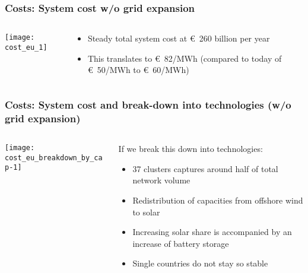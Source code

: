 \documentclass[10pt,aspectratio=169,dvipsnames]{beamer}
\let\olditem\item
\renewcommand{\item}{%
\olditem\vspace{5pt}}
\begin{document}
\begin{frame}
   \frametitle{Costs: System cost w/o grid expansion}


\begin{columns}[T]
\begin{column}{8.5cm}
  \texttt{[image: cost\_eu\_1]}
\end{column}
\begin{column}{6cm}

  \vspace{2cm}

  \begin{itemize}
  \item Steady total system cost at \euro~260 billion per year
   \item This translates to \euro~82/MWh (compared to today of \euro~50/MWh to \euro~60/MWh)
  \end{itemize}
\end{column}
\end{columns}

\end{frame}


\begin{frame}
  \frametitle{Costs: System cost and break-down into technologies {\large (w/o grid expansion)}}
\begin{columns}[T]
\begin{column}{8.5cm}
  \texttt{[image: cost\_eu\_breakdown\_by\_cap-1]}
\end{column}
\begin{column}{6cm}

  If we break this down into technologies:
  \begin{itemize}
  \item 37 clusters captures around half of total network volume
  \item Redistribution of capacities from offshore wind to solar
  \item Increasing solar share is accompanied by an increase of
    battery storage
  \item Single countries do not stay so stable
  \end{itemize}
\end{column}
\end{columns}
\end{frame}
\end{document}

